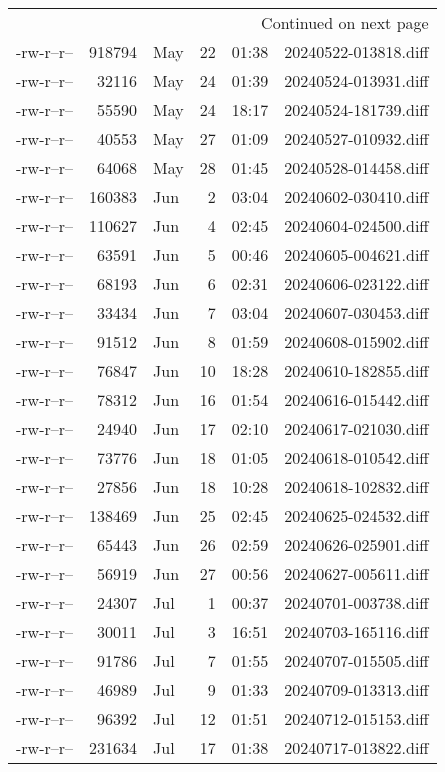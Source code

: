\documentclass[a4paper]{article}
\begin{document}
\begin{longtable}{lrlrrl}
\hline
\endhead
\hline\multicolumn{6}{r}{Continued on next page} \\
\endfoot
\endlastfoot
\hline
-rw-r--r-- & 918794 & May & 22 & 01:38 & 20240522-013818.diff\\[0pt]
-rw-r--r-- & 32116 & May & 24 & 01:39 & 20240524-013931.diff\\[0pt]
-rw-r--r-- & 55590 & May & 24 & 18:17 & 20240524-181739.diff\\[0pt]
-rw-r--r-- & 40553 & May & 27 & 01:09 & 20240527-010932.diff\\[0pt]
-rw-r--r-- & 64068 & May & 28 & 01:45 & 20240528-014458.diff\\[0pt]
-rw-r--r-- & 160383 & Jun & 2 & 03:04 & 20240602-030410.diff\\[0pt]
-rw-r--r-- & 110627 & Jun & 4 & 02:45 & 20240604-024500.diff\\[0pt]
-rw-r--r-- & 63591 & Jun & 5 & 00:46 & 20240605-004621.diff\\[0pt]
-rw-r--r-- & 68193 & Jun & 6 & 02:31 & 20240606-023122.diff\\[0pt]
-rw-r--r-- & 33434 & Jun & 7 & 03:04 & 20240607-030453.diff\\[0pt]
-rw-r--r-- & 91512 & Jun & 8 & 01:59 & 20240608-015902.diff\\[0pt]
-rw-r--r-- & 76847 & Jun & 10 & 18:28 & 20240610-182855.diff\\[0pt]
-rw-r--r-- & 78312 & Jun & 16 & 01:54 & 20240616-015442.diff\\[0pt]
-rw-r--r-- & 24940 & Jun & 17 & 02:10 & 20240617-021030.diff\\[0pt]
-rw-r--r-- & 73776 & Jun & 18 & 01:05 & 20240618-010542.diff\\[0pt]
-rw-r--r-- & 27856 & Jun & 18 & 10:28 & 20240618-102832.diff\\[0pt]
-rw-r--r-- & 138469 & Jun & 25 & 02:45 & 20240625-024532.diff\\[0pt]
-rw-r--r-- & 65443 & Jun & 26 & 02:59 & 20240626-025901.diff\\[0pt]
-rw-r--r-- & 56919 & Jun & 27 & 00:56 & 20240627-005611.diff\\[0pt]
-rw-r--r-- & 24307 & Jul & 1 & 00:37 & 20240701-003738.diff\\[0pt]
-rw-r--r-- & 30011 & Jul & 3 & 16:51 & 20240703-165116.diff\\[0pt]
-rw-r--r-- & 91786 & Jul & 7 & 01:55 & 20240707-015505.diff\\[0pt]
-rw-r--r-- & 46989 & Jul & 9 & 01:33 & 20240709-013313.diff\\[0pt]
-rw-r--r-- & 96392 & Jul & 12 & 01:51 & 20240712-015153.diff\\[0pt]
-rw-r--r-- & 231634 & Jul & 17 & 01:38 & 20240717-013822.diff\\[0pt]
\end{longtable}
\rmfamily
\end{document}
